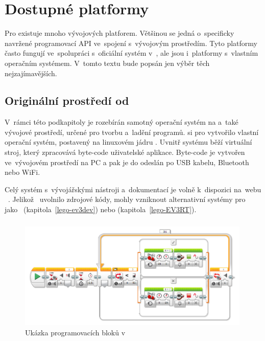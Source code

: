 \chapter{Dostupné platformy}
% 
% 
\label{lego-soft-available-platforms}


Pro \legoEV{} existuje mnoho vývojových platforem. 
Většinou se jedná o~specificky navržené programovací API ve~spojení s~vývojovým prostředím. 
Tyto platformy často fungují ve~spolupráci s~oficiální systém v~\EVthree{}, ale jsou i~platformy s~vlastním operačním systémem. 
V~tomto textu bude popsán jen výběr těch nejzajímavějších. %


\section{Originální prostředí od \lego}

V~rámci této podkapitoly je rozebírán samotný operační systém na \EVthree{} a~také vývojové prostředí, určené pro tvorbu a~ladění programů. 
\lego{} si pro \EVthree{} vytvořilo vlastní operační systém, postavený na linuxovém jádru \cite{legoMindstormsEV3_fw-dev-kit}. 
Uvnitř systému běží virtuální stroj, který zpracovává byte-code uživatelské aplikace. 
Byte-code je vytvořen ve~vývojovém prostředí na PC a pak je do  odeslán po USB kabelu, Bluetooth nebo WiFi.

Celý systém s~vývojářskými nástroji a~dokumentací je volně k~dispozici na~webu \lego{}~\cite{legoMindstorms_download}. Jelikož~\lego{} uvolnilo zdrojové kódy, mohly vzniknout alternativní systémy pro~\EVthree{} jako~\evThreeDev{} (kapitola~\ref{lego-ev3dev}) nebo \evRT{} (kapitola~\ref{lego-EV3RT}). 

\subsection{\legoSW{}}
\label{lego-soft-orig-problems}


\begin{figure}[h]
	\centering
	\includegraphics[width=0.99\textwidth]{images/lego-soft_robotut_switch-touch+motors+leds.png}
	\caption{Ukázka programovacích bloků v~\legoSW}
	\label{fig:lego-soft_example-blocks}
\end{figure}

